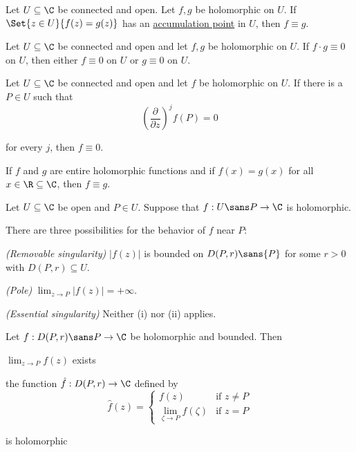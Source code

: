 \label{ac6f6ea}

Let $U\subseteq\C$ be connected and open. Let $f,g$ be holomorphic on $U$. If
$\Set{z\in U}{f(z)=g(z)}$ has an \href{b0219cd}{accumulation point} in $U$,
then $f\equiv g$.

\label{faf57f7}

Let $U\subseteq\C$ be connected and open and let $f,g$ be holomorphic on $U$.
If $f\cdot g\equiv0$ on $U$, then either $f\equiv0$ on $U$ or $g\equiv0$ on
$U$.

\label{dccfe6b}

Let $U\subseteq\C$ be connected and open and let $f$ be holomorphic on $U$. If
there is a $P\in U$ such that
$$
  \left(\frac\partial{\partial z}\right)^jf(P)=0
$$

for every $j$, then $f\equiv0$.

\label{bd8ae3b}

If $f$ and $g$ are entire holomorphic functions and if $f(x)=g(x)$ for all
$x\in\R\subseteq\C$, then $f\equiv g$.

\label{a7f062e}

Let $U\subseteq\C$ be open and $P\in U$. Suppose that $f:U\sans P\to\C$ is
holomorphic.

There are three possibilities for the behavior of $f$ near $P$:
\begin{enumerati}
  \item \textit{(Removable singularity)} $|f(z)|$ is bounded on $D(P,r)\sans{P}$
  for some $r>0$ with $D(P,r)\subseteq U$.
  \item \textit{(Pole)} $\lim_{z\to P}|f(z)|=+\infty$.
  \item \textit{(Essential singularity)} Neither (i) nor (ii) applies.
\end{enumerati}

\label{f42a663}

Let $f:D(P,r)\sans P\to\C$ be holomorphic and bounded. Then
\begin{enumerata}
  \item $\lim_{z\to P}f(z)$ exists
  \item the function $\hat f:D(P,r)\to\C$ defined by
  $$
    \hat f(z)=\begin{cases}
      f(z)                                   & \text{if }z\neq P \\
      \displaystyle\lim_{\zeta\to P}f(\zeta) & \text{if }z=P
    \end{cases}
  $$

  is holomorphic
\end{enumerata}

